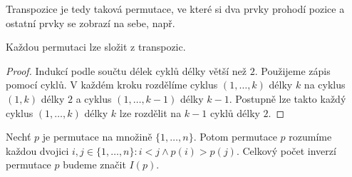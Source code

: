 \begin{remark}
    Transpozice je tedy taková permutace, ve které si dva prvky prohodí pozice 
    a ostatní prvky se zobrazí na sebe, např.
    \begin{center}
    \end{center}
\end{remark}

\begin{observation}
    Každou permutaci lze složit z transpozic.
\end{observation}

\begin{proof}
    Indukcí podle součtu délek cyklů délky větší než $2$. Použijeme zápis
    pomocí cyklů. V každém kroku rozdělíme cyklus $(1, \dots, k)$ délky $k$
    na cyklus $(1,k)$ délky $2$ a cyklus $(1, \dots, k-1)$ délky $k-1$. 
    Postupně lze takto každý cyklus $(1, \dots, k)$ délky $k$ lze rozdělit 
    na $k-1$ cyklů délky $2$.
\end{proof}

\begin{definition}
    Nechť $p$ je permutace na množině $\{1, \dots, n\}$. Potom 
     permutace $p$ rozumíme každou dvojici $i,j \in \{1, 
    \dots, n\}: i < j \land p(i) > p(j)$. Celkový počet inverzí permutace
    $p$ budeme značit $I(p)$.
\end{definition}

